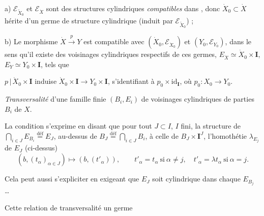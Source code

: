\documentclass[11pt,a4paper]{article}
\begin{document}
a) $\mathcal E_{\tilde X_0}$ et $\mathcal E_{\dot X}$ sont des  structures cylindriques \emph{compatibles} dans , donc $\dot X_0\subset\dot X$  hérite d'un  germe de structure cylindrique (induit par $\mathcal E_{\tilde X_0}$) ;

b) Le morphisme $\dot X\xrightarrow{\ p\ }Y$  est compatible avec $(\dot X_0,\mathcal E_{\dot X_0})$ et $(Y_0,\mathcal E_{Y_0})$, dans le sens  qu'il existe des voisinages cylindriques respectifs de ces germes,  \struck{\ill{}} $E_{\dot X}\simeq\dot X_0\times\mathbf{I}$, $E_Y\simeq Y_0\times\mathbf{I}$, tels que


$p\,|\,\dot X_0\times\mathbf{I}$ induise $\dot X_0\times\mathbf{I}\to Y_0\times\mathbf{I}$, s'identifiant à $p_0\times\mathrm{id}_{\mathbf{I}}$, où $p_0:X_0\to Y_0$.

 \emph{Transversalité} d'une famille finie $(B_i,E_i)$ de voisinages cylindriques de parties $B_i$ de $X$.

La condition s'exprime en disant que pour tout $J\subset I$, $I$ fini, la structure de $\bigcap_{i\in J}E_{B_i}\overset{\text{déf}}{=}E_J$, au-dessus de $B_J\overset{\text{déf}}{=}\bigcap_{i\in J}B_i$,  à celle de $B_J\times\mathbf{I}^J$, l'homothétie $\lambda_{E_j}$  de $E_J$ (ci-dessus) 
\[
(b,(t_\alpha)_{\alpha\in J})\longmapsto(b,(t'_\alpha)),\qquad
t'_\alpha=t_\alpha\ \text{si}\ \alpha\neq j,\quad t'_\alpha=\lambda t_\alpha\ \text{si}\ \alpha=j .
\]


Cela peut aussi s'expliciter en exigeant que $E_J$ soit cylindrique dans chaque $E_{B_j}$ \ldots

Cette relation de transversalité \ill{}  un germe \ill{}
\end{document}

